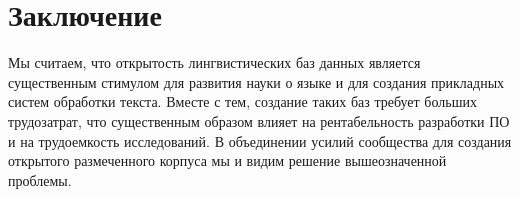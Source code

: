 \documentclass[a4paper]{article}
\begin{document}
\section{Заключение}
Мы считаем, что открытость лингвистических баз данных является существенным стимулом для развития науки о языке и для создания прикладных систем обработки текста. Вместе с тем, создание таких баз требует больших трудозатрат, что существенным образом влияет на рентабельность разработки ПО и на трудоемкость исследований. В объединении усилий сообщества для создания открытого размеченного корпуса мы и видим решение вышеозначенной проблемы.


\end{document}
